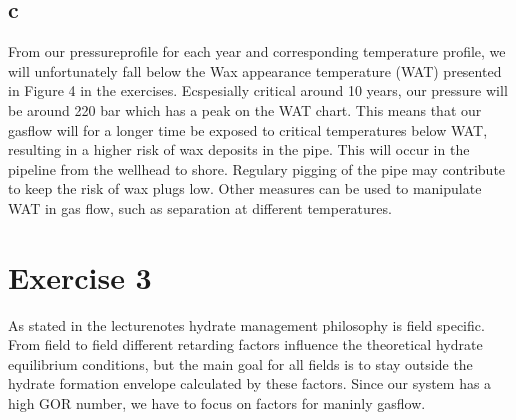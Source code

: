 \documentclass[a4paper,norsk]{article}
\begin{document}
\subsection*{c}
From our pressureprofile for each year and corresponding temperature profile, we will unfortunately fall below the
Wax appearance temperature (WAT) presented in Figure 4 in the exercises. Ecspesially critical around 10 years, our pressure will be around 220 bar which has a peak on the WAT chart. This means that our gasflow will for a longer time be exposed to critical temperatures below WAT, resulting in a higher risk of wax deposits in the pipe. This will occur in the pipeline from the wellhead to shore. Regulary pigging of the pipe may contribute to keep the risk of wax plugs low. Other measures can be used to manipulate WAT in gas flow, such as separation at different temperatures. 

\section*{Exercise 3}
As stated in the lecturenotes hydrate management philosophy is field specific. From field to field different retarding factors influence the theoretical hydrate equilibrium conditions, but the main goal for all fields is to stay outside the hydrate formation envelope calculated by these factors. Since our system has a high GOR number, we have to focus on factors for maninly gasflow. 
\begin{itemize}
\end{itemize}
\end{document}
